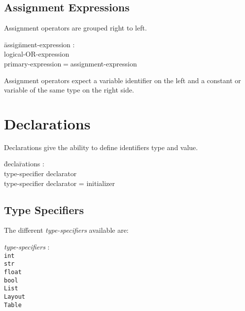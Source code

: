 \documentclass{article}
\begin{document}
\subsection{Assignment Expressions}
Assignment operators are grouped right to left.
\begin{itshape}
\begin{tabbing}
	\= assig\=nment-expression : \\
		\>\> logical-OR-expression \\
		\>\> primary-expression$=$assignment-expression 
\end{tabbing}
\end{itshape}
Assignment operators expect a variable identifier on the left and a constant or variable of the same type on the right side.


\section{Declarations}

Declarations give the ability to define identifiers type and value.
\begin{itshape}
\begin{tabbing}
	\= decla\=rations : \\
		\> \> type-specifier declarator \\
		\>\> type-specifier declarator = initializer \\
\end{tabbing}
\end{itshape}

\subsection{Type Specifiers}
The different \emph{type-specifiers} available are:

\begin{tabbing}
	\= \emph{type}\=\emph{-specifiers} : \\
		\>\> \texttt{int} \\
		\>\> \texttt{str} \\
		\>\> \texttt{float} \\
		\>\> \texttt{bool} \\
		\>\> \texttt{List} \\
		\>\> \texttt{Layout} \\
		\>\> \texttt{Table} \\
\end{tabbing}
\end{document}
